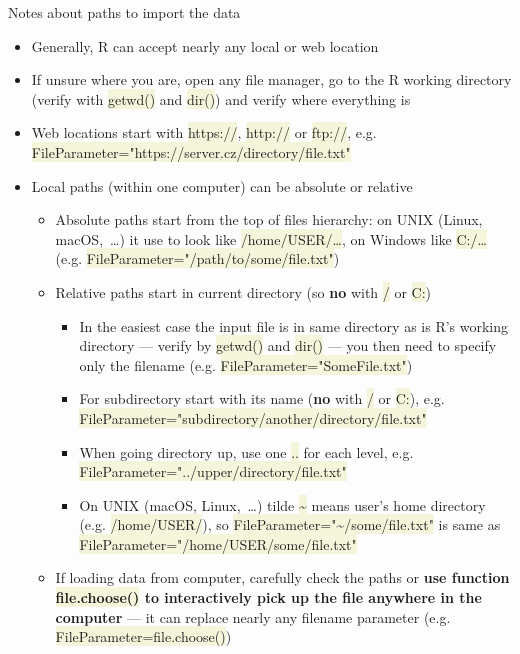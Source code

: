 \documentclass[compress, xelatex, 11pt, xcolor=svgnames, aspectratio=169, url={hyphens, lowtilde}]{beamer}
\renewcommand{\texttt}[1]{\colorbox{Beige}{{\ttfamily #1}}}
\begin{document}
\begin{frame}[allowframebreaks]{Notes about paths to import the data}
	\label{path}
	\begin{itemize}
		\item Generally, R can accept nearly any local or web location
		\item If unsure where you are, open any file manager, go to the R working directory (verify with \texttt{getwd()} and \texttt{dir()}) and verify where everything is
		\item Web locations start with \texttt{https://}, \texttt{http://} or \texttt{ftp://}, e.g. \texttt{FileParameter="https://server.cz/directory/file.txt"}
		\item Local paths (within one computer) can be absolute or relative
		\begin{itemize}
			\item Absolute paths start from the top of files hierarchy: on UNIX (Linux, macOS,~\ldots) it use to look like \texttt{/home/USER/\ldots}, on Windows like \texttt{C:/\ldots} (e.g. \texttt{FileParameter="/path/to/some/file.txt"})
			\item Relative paths start in current directory (so \textbf{no} with \texttt{/} or \texttt{C:})
			\begin{itemize}
	\item In the easiest case the input file is in same directory as is R's working directory --- verify by \texttt{getwd()} and \texttt{dir()} --- you then need to specify only the filename (e.g. \texttt{FileParameter="SomeFile.txt"})
	\item For subdirectory start with its name (\textbf{no} with \texttt{/} or \texttt{C:}), e.g. \texttt{FileParameter="subdirectory/another/directory/file.txt"}
	\item When going directory up, use one \texttt{..} for each level, e.g. \texttt{FileParameter="../upper/directory/file.txt"}
	\item On UNIX (macOS, Linux,~\ldots) tilde \texttt{\textasciitilde} means user's home directory (e.g. \texttt{/home/USER/}), so \texttt{FileParameter="\textasciitilde/some/file.txt"} is same as \texttt{FileParameter="/home/USER/some/file.txt"}
			\end{itemize}
			\item If loading data from computer, carefully check the paths or \textbf{use function \texttt{file.choose()} to interactively pick up the file anywhere in the computer} --- it can replace nearly any filename parameter (e.g. \alert{\texttt{FileParameter=file.choose()}})

\end{itemize}
\end{itemize}
\end{frame}
\end{document}
